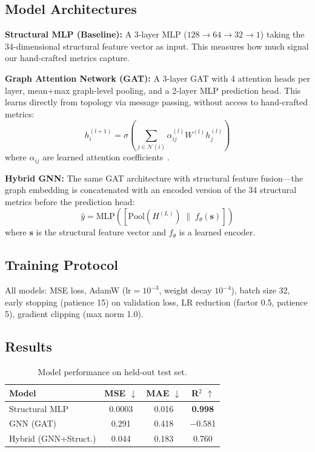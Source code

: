 \documentclass[10pt,twocolumn]{article}
\begin{document}
\subsection{Model Architectures}

\textbf{Structural MLP (Baseline):} A 3-layer MLP ($128 \to 64 \to 32 \to 1$) taking the 34-dimensional structural feature vector as input. This measures how much signal our hand-crafted metrics capture.

\textbf{Graph Attention Network (GAT):} A 3-layer GAT with 4 attention heads per layer, mean+max graph-level pooling, and a 2-layer MLP prediction head. This learns directly from topology via message passing, without access to hand-crafted metrics:
\begin{equation}
h_i^{(l+1)} = \sigma\!\left(\sum_{j \in \mathcal{N}(i)} \alpha_{ij}^{(l)} W^{(l)} h_j^{(l)}\right)
\end{equation}
where $\alpha_{ij}$ are learned attention coefficients~\cite{velickovic2018gat}.

\textbf{Hybrid GNN:} The same GAT architecture with structural feature fusion---the graph embedding is concatenated with an encoded version of the 34 structural metrics before the prediction head:
\begin{equation}
\hat{y} = \text{MLP}\!\left([\text{Pool}(H^{(L)})\; \|\; f_\theta(\mathbf{s})]\right)
\end{equation}
where $\mathbf{s}$ is the structural feature vector and $f_\theta$ is a learned encoder.

\subsection{Training Protocol}

All models: MSE loss, AdamW ($\text{lr}=10^{-3}$, weight decay $10^{-4}$), batch size 32, early stopping (patience 15) on validation loss, LR reduction (factor 0.5, patience 5), gradient clipping (max norm 1.0).

\subsection{Results}

\begin{table}[H]
\centering
\small
\caption{Model performance on held-out test set.}
\label{tab:results}
\begin{tabular}{@{}lccc@{}}
\toprule
\textbf{Model} & \textbf{MSE} $\downarrow$ & \textbf{MAE} $\downarrow$ & \textbf{R$^2$} $\uparrow$ \\
\midrule
Structural MLP & 0.0003 & 0.016 & \textbf{0.998} \\
GNN (GAT) & 0.291 & 0.418 & $-$0.581 \\
Hybrid (GNN+Struct.) & 0.044 & 0.183 & 0.760 \\
\bottomrule
\end{tabular}
\end{table}
\end{document}
